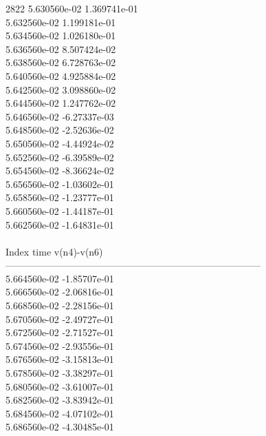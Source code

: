 2822	5.630560e-02	1.369741e-01	\\ 	5.632560e-02	1.199181e-01	\\ 	5.634560e-02	1.026180e-01	\\ 	5.636560e-02	8.507424e-02	\\ 	5.638560e-02	6.728763e-02	\\ 	5.640560e-02	4.925884e-02	\\ 	5.642560e-02	3.098860e-02	\\ 	5.644560e-02	1.247762e-02	\\ 	5.646560e-02	-6.27337e-03	\\ 	5.648560e-02	-2.52636e-02	\\ 	5.650560e-02	-4.44924e-02	\\ 	5.652560e-02	-6.39589e-02	\\ 	5.654560e-02	-8.36624e-02	\\ 	5.656560e-02	-1.03602e-01	\\ 	5.658560e-02	-1.23777e-01	\\ 	5.660560e-02	-1.44187e-01	\\ 	5.662560e-02	-1.64831e-01	\\ \hline
\\ \hline
Index   time            v(n4)-v(n6)     \\ \hline
--------------------------------------------------------------------------------\\ 	5.664560e-02	-1.85707e-01	\\ 	5.666560e-02	-2.06816e-01	\\ 	5.668560e-02	-2.28156e-01	\\ 	5.670560e-02	-2.49727e-01	\\ 	5.672560e-02	-2.71527e-01	\\ 	5.674560e-02	-2.93556e-01	\\ 	5.676560e-02	-3.15813e-01	\\ 	5.678560e-02	-3.38297e-01	\\ 	5.680560e-02	-3.61007e-01	\\ 	5.682560e-02	-3.83942e-01	\\ 	5.684560e-02	-4.07102e-01	\\ 	5.686560e-02	-4.30485e-01	\\ \hline

